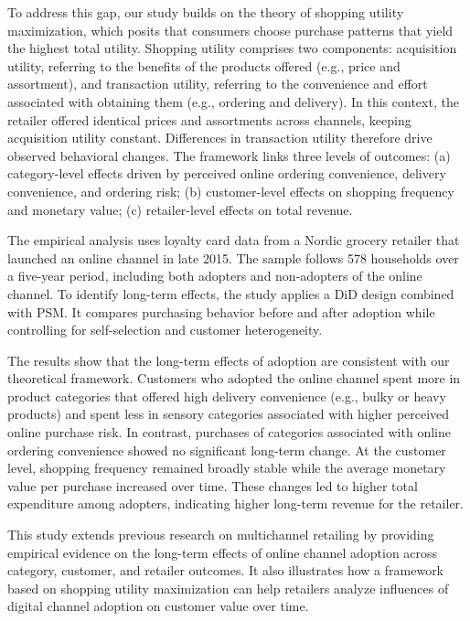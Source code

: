 To address this gap, our study builds on the theory of shopping utility maximization, which posits that consumers choose purchase patterns that yield the highest total utility. Shopping utility comprises two components: acquisition utility, referring to the benefits of the products offered (e.g., price and assortment), and transaction utility, referring to the convenience and effort associated with obtaining them (e.g., ordering and delivery). In this context, the retailer offered identical prices and assortments across channels, keeping acquisition utility constant. Differences in transaction utility therefore drive observed behavioral changes. The framework links three levels of outcomes: (a) category-level effects driven by perceived online ordering convenience, delivery convenience, and ordering risk; (b) customer-level effects on shopping frequency and monetary value; (c) retailer-level effects on total revenue.

The empirical analysis uses loyalty card data from a Nordic grocery retailer that launched an online channel in late 2015. The sample follows 578 households over a five-year period, including both adopters and non-adopters of the online channel. To identify long-term effects, the study applies a DiD design combined with PSM. It compares purchasing behavior before and after adoption while controlling for self-selection and customer heterogeneity.

The results show that the long-term effects of adoption are consistent with our theoretical framework. Customers who adopted the online channel spent more in product categories that offered high delivery convenience (e.g., bulky or heavy products) and spent less in sensory categories associated with higher perceived online purchase risk. In contrast, purchases of categories associated with online ordering convenience showed no significant long-term change. At the customer level, shopping frequency remained broadly stable while the average monetary value per purchase increased over time. These changes led to higher total expenditure among adopters, indicating higher long-term revenue for the retailer.

This study extends previous research on multichannel retailing by providing empirical evidence on the long-term effects of online channel adoption across category, customer, and retailer outcomes. It also illustrates how a framework based on shopping utility maximization can help retailers analyze influences of digital channel adoption on customer value over time.



